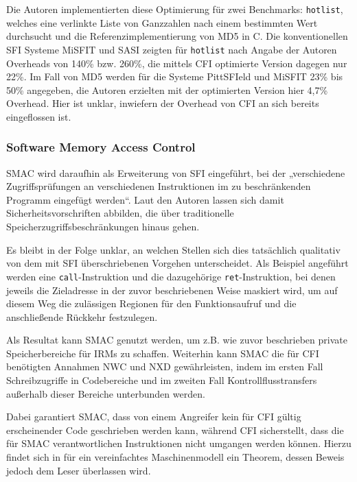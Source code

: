 \documentclass[11pt]{article}
\begin{document}
Die Autoren implementierten diese Optimierung für zwei Benchmarks:
\texttt{hotlist}, welches eine verlinkte Liste von Ganzzahlen nach einem
bestimmten Wert durchsucht und die Referenzimplementierung von MD5 in C. Die
konventionellen SFI Systeme MiSFIT und SASI zeigten für \texttt{hotlist} nach
Angabe der Autoren Overheads von 140\% bzw. 260\%, die mittels CFI optimierte
Version dagegen nur 22\%. Im Fall von MD5 werden für die Systeme PittSFIeld und
MiSFIT 23\% bis 50\% angegeben, die Autoren erzielten mit der optimierten
Version hier 4,7\% Overhead. Hier ist unklar, inwiefern der Overhead von CFI an
sich bereits eingeflossen ist.

\subsubsection{Software Memory Access Control}
\label{smac}

SMAC wird daraufhin als Erweiterung von SFI eingeführt, bei der „verschiedene
Zugriffsprüfungen an verschiedenen Instruktionen im zu beschränkenden Programm
eingefügt werden“. Laut den Autoren lassen sich damit Sicherheitsvorschriften
abbilden, die über traditionelle Speicherzugriffsbeschränkungen hinaus gehen.

Es bleibt in der Folge unklar, an welchen Stellen sich dies tatsächlich
qualitativ von dem mit SFI überschriebenen Vorgehen unterscheidet. Als Beispiel
angeführt werden eine \texttt{call}-Instruktion und die dazugehörige
\texttt{ret}-Instruktion, bei denen jeweils die Zieladresse in der zuvor
beschriebenen Weise maskiert wird, um auf diesem Weg die zulässigen Regionen
für den Funktionsaufruf und die anschließende Rückkehr festzulegen.

Als Resultat kann SMAC genutzt werden, um z.B. wie zuvor beschrieben private
Speicherbereiche für IRMs zu schaffen. Weiterhin kann SMAC die für CFI
benötigten Annahmen NWC und NXD gewährleisten, indem im ersten Fall
Schreibzugriffe in Codebereiche und im zweiten Fall Kontrollflusstransfers
außerhalb dieser Bereiche unterbunden werden.

Dabei garantiert SMAC, dass von einem Angreifer kein für CFI gültig
erscheinender Code geschrieben werden kann, während CFI sicherstellt, dass die
für SMAC verantwortlichen Instruktionen nicht umgangen werden können. Hierzu
findet sich in \cite{abadi-2005-theory-fmse} für ein vereinfachtes
Maschinenmodell ein Theorem, dessen Beweis jedoch dem Leser überlassen wird.

\end{document}
